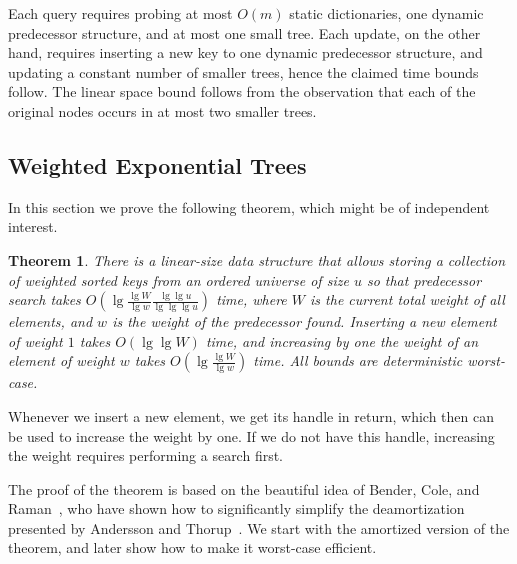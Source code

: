 \documentclass[11pt,onecolumn,final]{article} \usepackage{a4}
\theoremstyle{plain}
\newtheorem{theorem}[definition]{Theorem}
\theoremstyle{remark}
\begin{document}
Each query requires probing at most $O(m)$ static dictionaries, one dynamic predecessor structure, and at most one small tree. Each update, on the other hand, requires inserting a new key to one dynamic predecessor structure, and updating a constant number of smaller trees, hence the claimed time bounds follow. The linear space bound follows from the observation that each of the original nodes occurs in at most two smaller trees.

\subsection{Weighted Exponential Trees}

In this section we prove the following theorem, which might be of independent interest.

\begin{theorem}
\label{thm:wexponential}
There is a linear-size data structure that allows storing a collection of weighted sorted keys from an ordered universe of size $u$ so that predecessor search takes $O(\lg\frac{\lg W}{\lg w}\frac{\lg\lg u}{\lg\lg\lg u})$ time, where $W$ is the current total weight of all elements, and $w$ is the weight of the predecessor found. Inserting a new element of weight $1$ takes $O(\lg\lg W)$ time, and increasing by one the weight of an element of weight $w$ takes $O(\lg\frac{\lg W}{\lg w})$ time. All bounds are deterministic worst-case.
\end{theorem}

Whenever we insert a new element, we get its handle in return, which then can be used to increase the weight by one. If we do not have this handle, increasing the weight requires performing a search first.

The proof of the theorem is based on the beautiful idea of Bender, Cole, and Raman~\cite{bender02exponential}, who have shown how to significantly simplify the deamortization presented by Andersson and Thorup~\cite{andersson07dynamic}. We start with the amortized version of the theorem, and later show how to make it worst-case efficient.
\end{document}
